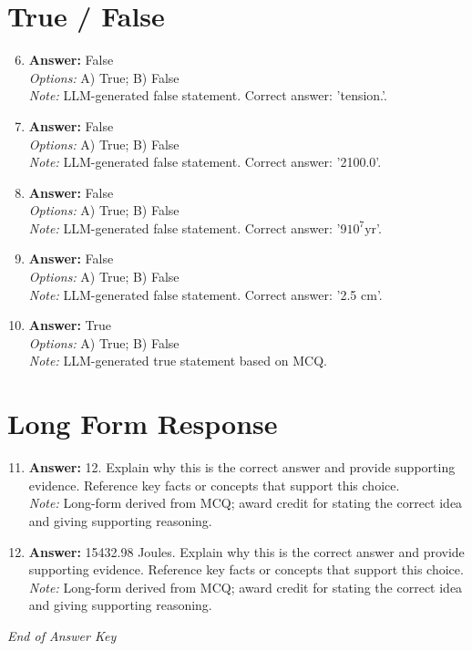 \documentclass[12pt]{article}
\begin{document}
\section*{True / False}
\begin{enumerate}[label=\arabic*.]
\setcounter{enumi}{5}
\item \textbf{Answer:} False
\\ \textit{Options:} A) True; B) False
\\ \textit{Note:} LLM-generated false statement. Correct answer: 'tension.'.
\item \textbf{Answer:} False
\\ \textit{Options:} A) True; B) False
\\ \textit{Note:} LLM-generated false statement. Correct answer: '2100.0'.
\item \textbf{Answer:} False
\\ \textit{Options:} A) True; B) False
\\ \textit{Note:} LLM-generated false statement. Correct answer: '9$10^7 \mathrm{yr}$'.
\item \textbf{Answer:} False
\\ \textit{Options:} A) True; B) False
\\ \textit{Note:} LLM-generated false statement. Correct answer: '2.5 cm'.
\item \textbf{Answer:} True
\\ \textit{Options:} A) True; B) False
\\ \textit{Note:} LLM-generated true statement based on MCQ.
\end{enumerate}

\section*{Long Form Response}
\begin{enumerate}[label=\arabic*.]
\setcounter{enumi}{10}
\item \textbf{Answer:} 12. Explain why this is the correct answer and provide supporting evidence. Reference key facts or concepts that support this choice.
\\ \textit{Note:} Long-form derived from MCQ; award credit for stating the correct idea and giving supporting reasoning.
\item \textbf{Answer:} 15432.98 Joules. Explain why this is the correct answer and provide supporting evidence. Reference key facts or concepts that support this choice.
\\ \textit{Note:} Long-form derived from MCQ; award credit for stating the correct idea and giving supporting reasoning.
\end{enumerate}

\vfill
\noindent\textit{End of Answer Key}
\end{document}
